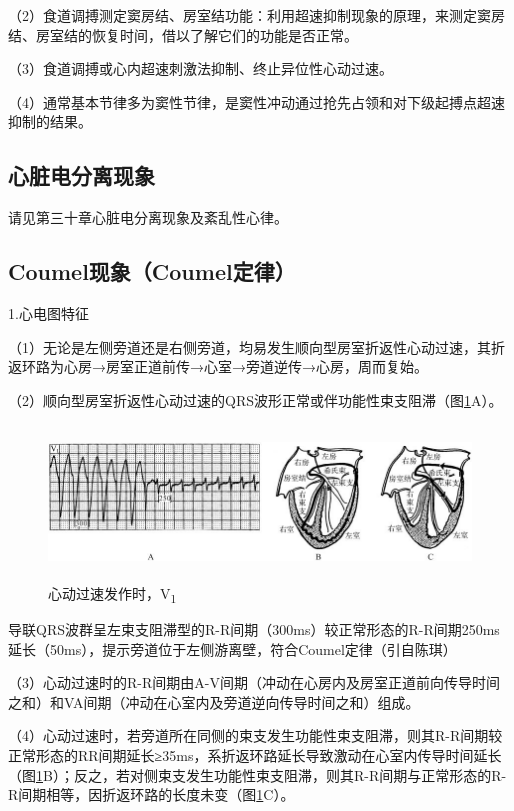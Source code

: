 （2）食道调搏测定窦房结、房室结功能：利用超速抑制现象的原理，来测定窦房结、房室结的恢复时间，借以了解它们的功能是否正常。

（3）食道调搏或心内超速刺激法抑制、终止异位性心动过速。

（4）通常基本节律多为窦性节律，是窦性冲动通过抢先占领和对下级起搏点超速抑制的结果。

\protect\hypertarget{text00047.htmlux5cux23subid546}{}{}

\subsection{心脏电分离现象}

请见第三十章心脏电分离现象及紊乱性心律。

\protect\hypertarget{text00047.htmlux5cux23subid547}{}{}

\subsection{Coumel现象（Coumel定律）}

1.心电图特征

（1）无论是左侧旁道还是右侧旁道，均易发生顺向型房室折返性心动过速，其折返环路为心房→房室正道前传→心室→旁道逆传→心房，周而复始。

（2）顺向型房室折返性心动过速的QRS波形正常或伴功能性束支阻滞（图\ref{fig40-11}A）。

\begin{figure}[!htbp]
 \centering
 \includegraphics[width=5.78125in,height=1.61458in]{./images/Image00672.jpg}
 \captionsetup{justification=centering}
 \caption{心动过速发作时，V\textsubscript{1}}
 \label{fig40-11}
  \end{figure} 
导联QRS波群呈左束支阻滞型的R-R间期（300ms）较正常形态的R-R间期250ms延长（50ms），提示旁道位于左侧游离壁，符合Coumel定律（引自陈琪）

（3）心动过速时的R-R间期由A-V间期（冲动在心房内及房室正道前向传导时间之和）和VA间期（冲动在心室内及旁道逆向传导时间之和）组成。

（4）心动过速时，若旁道所在同侧的束支发生功能性束支阻滞，则其R-R间期较正常形态的RR间期延长≥35ms，系折返环路延长导致激动在心室内传导时间延长（图\ref{fig40-11}B）；反之，若对侧束支发生功能性束支阻滞，则其R-R间期与正常形态的R-R间期相等，因折返环路的长度未变（图\ref{fig40-11}C）。

